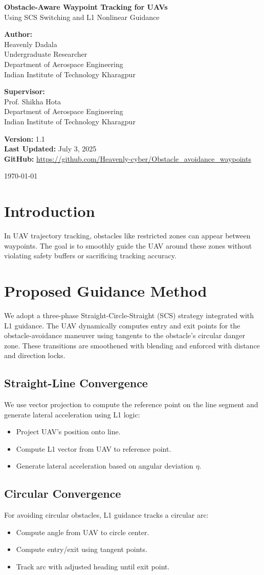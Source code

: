 \documentclass[12pt]{article}
\newcommand{\maketitlepage}{
\begin{titlepage}
    \centering
    \vspace*{2.5cm}

    {\Huge \bfseries Obstacle-Aware Waypoint Tracking for UAVs}\\[0.4cm]
    {\Large Using SCS Switching and L1 Nonlinear Guidance}\\[1.8cm]

    \begin{flushleft}
    \textbf{Author:} \\[0.2cm]
    Heavenly Dadala \\
    Undergraduate Researcher \\
    Department of Aerospace Engineering \\
    Indian Institute of Technology Kharagpur
    \end{flushleft}

    \vspace{1.3cm}

    \begin{flushleft}
    \textbf{Supervisor:} \\[0.2cm]
    Prof. Shikha Hota \\
    Department of Aerospace Engineering \\
    Indian Institute of Technology Kharagpur
    \end{flushleft}

    \vfill

    \begin{flushleft}
    \textbf{Version:} 1.1 \\
    \textbf{Last Updated:} July 3, 2025 \\
    \textbf{GitHub:} \url{https://github.com/Heavenly-cyber/Obstacle_avoidance_waypoints}
    \end{flushleft}

    \vspace{1.2cm}
    \begin{center}
    \large \today
    \end{center}
\end{titlepage}
}
\begin{document}
\maketitlepage

\tableofcontents
\newpage


\section{Introduction}
In UAV trajectory tracking, obstacles like restricted zones can appear between waypoints. The goal is to smoothly guide the UAV around these zones without violating safety buffers or sacrificing tracking accuracy.

\section{Proposed Guidance Method}
We adopt a three-phase Straight-Circle-Straight (SCS) strategy integrated with L1 guidance. The UAV dynamically computes entry and exit points for the obstacle-avoidance maneuver using tangents to the obstacle's circular danger zone. These transitions are smoothened with blending and enforced with distance and direction locks.

\subsection{Straight-Line Convergence}
We use vector projection to compute the reference point on the line segment and generate lateral acceleration using L1 logic:
\begin{itemize}
  \item Project UAV's position onto line.
  \item Compute L1 vector from UAV to reference point.
  \item Generate lateral acceleration based on angular deviation $\eta$.
\end{itemize}

\subsection{Circular Convergence}
For avoiding circular obstacles, L1 guidance tracks a circular arc:
\begin{itemize}
  \item Compute angle from UAV to circle center.
  \item Compute entry/exit using tangent points.
  \item Track arc with adjusted heading until exit point.
\end{itemize}
\end{document}
